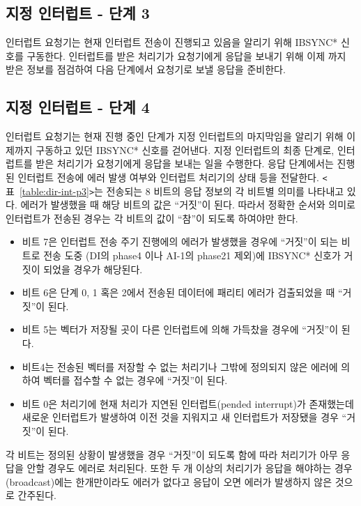\subsection*{지정 인터럽트 - 단계 3}
인터럽트 요청기는 현재 인터럽트 전송이 진행되고 있음을 알리기 위해 IBSYNC* 신호를 구동한다.
인터럽트를 받은 처리기가 요청기에게 응답을 보내기 위해 이제 까지 받은 정보를 점검하여
다음 단계에서 요청기로 보낼 응답을 준비한다.
%
\subsection*{지정 인터럽트 - 단계 4}
인터럽트 요청기는 현재 진행 중인 단계가 지정 인터럽트의 마지막임을 알리기 위해 이제까지
구동하고 있던 IBSYNC* 신호를 걷어낸다.
지정 인터럽트의 최종 단계로, 인터럽트를 받은 처리기가 요청기에게 응답을 보내는 일을 수행한다.
응답 단계에서는 진행된 인터럽트 전송에 에러 발생 여부와 인터럽트 처리기의 상태 등을 전달한다.
{\tt <}표~\ref{table:dir-int-p3}{\tt >}는 전송되는 8 비트의 응답 정보의
각 비트별 의미를 나타내고 있다.
에러가 발생했을 때 해당 비트의 값은 ``거짓''이 된다.
따라서 정확한 순서와 의미로 인터럽트가 전송된 경우는 각 비트의 값이 ``참''이 되도록 하여야만 한다.

\begin{itemize}
	\item 비트 7은 인터럽트 전송 주기 진행에의 에러가 발생했을 경우에 ``거짓''이 되는 비트로
		전송 도중 (DI의 phase4 이나 AI-1의 phase21 제외)에 IBSYNC* 신호가 거짓이
		되었을 경우가 해당된다.
	\item 비트 6은 단계 0, 1 혹은 2에서 전송된 데이터에 패리티 에러가 검출되었을 때 ``거짓''이 된다.
	\item 비트 5는 벡터가 저장될 곳이 다른 인터럽트에 의해 가득찼을 경우에 ``거짓''이 된다.
	\item 비트4는 전송된 벡터를 저장할 수 없는 처리기나 그밖에 정의되지 않은 에러에 의하여
		벡터를 접수할 수 없는 경우에 ``거짓''이 된다.
	\item 비트 0은 처리기에 현재 처리가 지연된 인터럽트(pended interrupt)가 존재했는데 
		새로운 인터럽트가 발생하여 이전 것을 지워지고 새 인터럽트가 저장됐을 경우 ``거짓''이 된다.
\end{itemize}
각 비트는 정의된 상황이 발생했을 경우 ``거짓''이 되도록 함에 따라
처리기가 아무 응답을 안할 경우도 에러로 처리된다. 
또한 두 개 이상의 처리기가 응답을 해야하는 경우(broadcast)에는 한개만이라도 에러가 없다고
응답이 오면 에러가 발생하지 않은 것으로 간주된다.
